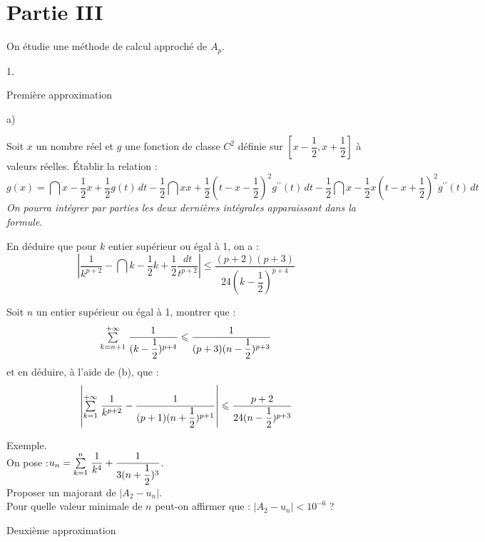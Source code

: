\documentclass[11pt]{article}%
\begin{document}
\section*{Partie III}

On étudie une méthode de calcul approché de $A_{p}$.

\begin{noliste}{1.}
 \setlength{\itemsep}{4mm}
\item Première approximation

\begin{noliste}{a)}
 \setlength{\itemsep}{2mm}
\item Soit $x$ un nombre réel et $g$ une fonction de classe $C^{2}$
définie
sur $\left[ x-{\dfrac{1}{2}},x + {\dfrac{1}{2}}\right] $ à valeurs
réelles.
Établir la relation : 
\[
g(x) = \dint{x-{\frac{1}{2}}}{x +
{\frac{1}{2}}}g(t)\,dt-{\dfrac{1}{2}}\dint{x}{x +
{\frac{1}{2}}}(t-x-{\dfrac{1}{2}})^{2}g^{\prime \prime
}(t)\,dt-{\dfrac{1}{2}}\dint{x-{\frac{1}{2}}}{x}(t-x +
{\dfrac{1}{2}})^{2}g^{\prime \prime }(t)\,dt
\]
\textit{On pourra intégrer par parties les deux dernières intégrales
apparaissant dans la formule}.

\item En déduire que pour $k$ entier supérieur ou égal à 1, on a : 
\[
\left| {\dfrac{1}{k^{p + 2}}}-\dint{k-{\frac{1}{2}}}{k +
{\frac{1}{2}}}{\frac{dt}{t^{p + 2}}}\right| \leq {\dfrac{(p + 2)(p +
3)}{24(k-{\dfrac{1}{2}})^{p + 4}}}
\]

\item Soit $n$ un entier supérieur ou égal à 1, montrer que : 
\[
{\textstyle\sum\limits_{k = n + 1}^{+ \infty }}\hspace{.1cm}{\dfrac{1}{(k-{\dfrac{1}{2}})^{p + 4}}}\leqslant 
{\dfrac{1}{(p + 3)(n-{\dfrac{1}{2}})^{p + 3}}}
\]
et en déduire, à l'aide de (b), que : 
\[
\left| {\textstyle\sum\limits_{k = 1}^{+ \infty }}\hspace{.1cm}{\dfrac{1}{k^{p + 2}}}-{\dfrac{1}{(p +
1)(n + {\dfrac{1}{2}})^{p + 1}}}\right| \leqslant {\dfrac{p +
2}{24(n-{\dfrac{1}{2}})^{p + 3}}}
\]

\item Exemple.\\
On pose :\qquad $u_{n} = {\textstyle\sum\limits_{k = 1}^{n}}\hspace{.1cm}{\dfrac{1}{k^{4}}} +
{\dfrac{1}{3(n + {\dfrac{1}{2}})^{3}}}$.\\
Proposer un majorant de $\left| A_{2}-u_{n}\right| $.\\
Pour quelle valeur minimale de $n$ peut-on affirmer que : $\left|
A_{2}-u_{n}\right| <10^{-6}$ ?
\end{noliste}

\item Deuxième approximation


\end{noliste}
\end{document}
